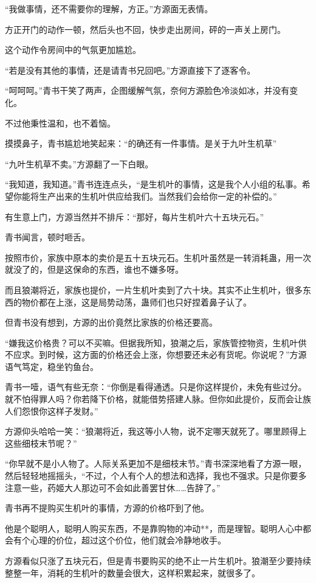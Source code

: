\begin{this_body}
“我做事情，还不需要你的理解，方正。”方源面无表情。

方正开门的动作一顿，然后头也不回，快步走出房间，砰的一声关上房门。

这个动作令房间中的气氛更加尴尬。

“若是没有其他的事情，还是请青书兄回吧。”方源直接下了逐客令。

“呵呵呵。”青书干笑了两声，企图缓解气氛，奈何方源脸色冷淡如冰，并没有变化。

不过他秉性温和，也不着恼。

摸摸鼻子，青书尴尬地笑起来：“的确还有一件事情。是关于九叶生机草”

“九叶生机草不卖。”方源翻了一下白眼。

“我知道，我知道。”青书连连点头，“是生机叶的事情，这是我个人小组的私事。希望你能将生产出来的生机叶供应给我们。当然我们会给你一定的补偿的。”

有生意上门，方源当然并不排斥：“那好，每片生机叶六十五块元石。”

青书闻言，顿时咂舌。

按照市价，家族中原本的卖价是五十五块元石。生机叶虽然是一转消耗蛊，用一次就没了的，但是这保命的东西，谁也不嫌多呀。

而且狼潮将近，家族也提价，一片生机叶卖到了六十块。其实不止生机叶，很多东西的物价都在上涨，这是局势动荡，蛊师们也只好捏着鼻子认了。

但青书没有想到，方源的出价竟然比家族的价格还要高。

“嫌我这价格贵？可以不买嘛。但据我所知，狼潮之后，家族管控物资，生机叶供不应求。到时候，这方面的价格还会上涨，你想要还未必有货呢。你说呢？”方源语气笃定，稳坐钓鱼台。

青书一噎，语气有些无奈：“你倒是看得通透。只是你这样提价，未免有些过分。就不怕得罪人吗？你若降下价格，就能借势搭建人脉。但你如此提价，反而会让族人们怨恨你这样子发财。”

方源仰头哈哈一笑：“狼潮将近，我这等小人物，说不定哪天就死了。哪里顾得上这些细枝末节呢？”

“你早就不是小人物了。人际关系更加不是细枝末节。”青书深深地看了方源一眼，然后轻轻地摇摇头，“不过，个人有个人的想法和选择，我也不强求。只是你要多注意一些，药姬大人那边可不会如此善罢甘休……告辞了。”

青书再不提购买生机叶的事情，方源的价格吓到了他。

他是个聪明人，聪明人购买东西，不是靠购物的冲动**，而是理智。聪明人心中都会有个心理的价位，超过这个价位，他们就会冷静地收手。

方源看似只涨了五块元石，但是青书要购买的绝不止一片生机叶。狼潮至少要持续整整一年，消耗的生机叶的数量会很大，这样积累起来，就很多了。


\end{this_body}
